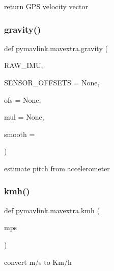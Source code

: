 \begin{DoxyVerb}return GPS velocity vector\end{DoxyVerb}
 \mbox{\label{namespacepymavlink_1_1mavextra_a762c44817d971674ece6d3c0cd90eedd}} 
\subsubsection{\texorpdfstring{gravity()}{gravity()}}
{\footnotesize\ttfamily def pymavlink.\+mavextra.\+gravity (\begin{DoxyParamCaption}\item[{}]{R\+A\+W\+\_\+\+I\+MU,  }\item[{}]{S\+E\+N\+S\+O\+R\+\_\+\+O\+F\+F\+S\+E\+TS = {\ttfamily None},  }\item[{}]{ofs = {\ttfamily None},  }\item[{}]{mul = {\ttfamily None},  }\item[{}]{smooth = {} }\end{DoxyParamCaption})}

\begin{DoxyVerb}estimate pitch from accelerometer\end{DoxyVerb}
 \mbox{\label{namespacepymavlink_1_1mavextra_a763fb9e3242f5ec9ec1fec177c4e50ae}} 
\subsubsection{\texorpdfstring{kmh()}{kmh()}}
{\footnotesize\ttfamily def pymavlink.\+mavextra.\+kmh (\begin{DoxyParamCaption}\item[{}]{mps }\end{DoxyParamCaption})}

\begin{DoxyVerb}convert m/s to Km/h\end{DoxyVerb}
 \mbox{\label{namespacepymavlink_1_1mavextra_ae160af64a51d6e6c620fc12450857585}} 
